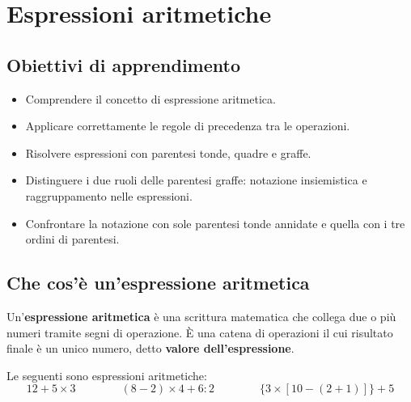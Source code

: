 
\chapter{Espressioni aritmetiche}

\section*{Obiettivi di apprendimento}
\begin{itemize}[leftmargin=1.5em]
    \item Comprendere il concetto di espressione aritmetica.
    \item Applicare correttamente le regole di precedenza tra le operazioni.
    \item Risolvere espressioni con parentesi tonde, quadre e graffe.
    \item Distinguere i due ruoli delle parentesi graffe: notazione insiemistica
          e raggruppamento nelle espressioni.
    \item Confrontare la notazione con sole parentesi tonde annidate e quella
          con i tre ordini di parentesi.
\end{itemize}

\section{Che cos'è un'espressione aritmetica}

\begin{definizione}
    Un'\textbf{espressione aritmetica} è una scrittura matematica che collega
    due o più numeri tramite segni di operazione. È una catena di operazioni il
    cui risultato finale è un unico numero, detto \textbf{valore dell'espressione}.
\end{definizione}

\begin{esempio}
    Le seguenti sono espressioni aritmetiche:
    \[
        12 + 5 \times 3 \qquad\qquad
        (8 - 2) \times 4 + 6 : 2 \qquad\qquad
        \{3 \times [10 - (2 + 1)]\} + 5
    \]
\end{esempio}

